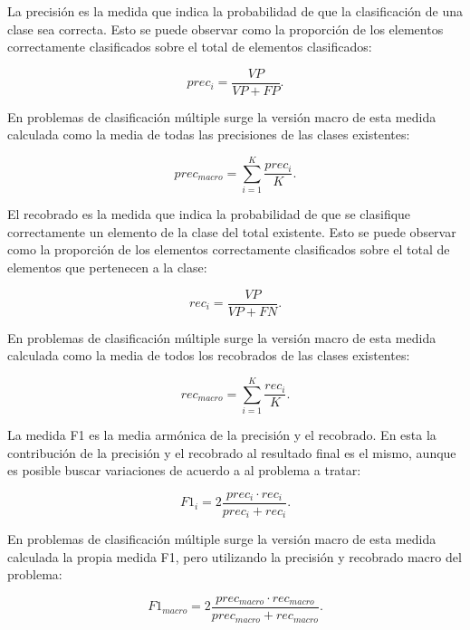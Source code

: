 La precisión es la medida que indica la probabilidad de que la clasificación de una clase sea correcta. Esto 
se puede observar como la proporción de los elementos correctamente clasificados sobre el total de 
elementos clasificados:

\begin{equation}
	prec_i = \frac{VP}{VP + FP}.
\end{equation}

En problemas de clasificación múltiple surge la versión macro de esta medida calculada como la media de todas
las precisiones de las clases existentes:

\begin{equation}
	prec_{macro} = \sum^K_{i=1} \frac{prec_i}{K}.
\end{equation}

El recobrado es la medida que indica la probabilidad de que se clasifique correctamente un elemento de la clase
del total existente. Esto se puede observar como la proporción de los elementos correctamente clasificados sobre el 
total de elementos que pertenecen a la clase:

\begin{equation}
	rec_i = \frac{VP}{VP + FN}.
\end{equation}

En problemas de clasificación múltiple surge la versión macro de esta medida calculada como la media de todos
los recobrados de las clases existentes:

\begin{equation}
	rec_{macro} = \sum^K_{i=1} \frac{rec_i}{K}.
\end{equation}

La medida F1 es la media armónica de la precisión y el recobrado. En esta la contribución de la precisión y el
recobrado al resultado final es el mismo, aunque es posible buscar variaciones de acuerdo a al problema a tratar:

\begin{equation}
	F1_i = 2 \frac{prec_i \cdot rec_i}{prec_i + rec_i}.
\end{equation}

En problemas de clasificación múltiple surge la versión macro de esta medida calculada la propia medida F1, pero
utilizando la precisión y recobrado macro del problema:

\begin{equation}
	F1_{macro} = 2 \frac{prec_{macro} \cdot rec_{macro}}{prec_{macro} + rec_{macro}}.
\end{equation}

